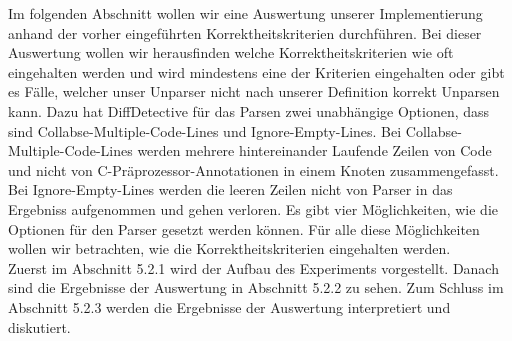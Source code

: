 Im folgenden Abschnitt wollen wir eine Auswertung unserer Implementierung anhand der vorher eingeführten Korrektheitskriterien durchführen. Bei dieser Auswertung wollen wir herausfinden welche Korrektheitskriterien wie oft eingehalten werden und wird mindestens eine der Kriterien eingehalten oder gibt es Fälle, welcher unser Unparser nicht nach unserer Definition korrekt Unparsen kann. Dazu hat DiffDetective für das Parsen zwei unabhängige Optionen, dass sind Collabse-Multiple-Code-Lines und Ignore-Empty-Lines. Bei Collabse-Multiple-Code-Lines werden mehrere hintereinander Laufende Zeilen von Code und nicht von C-Präprozessor-Annotationen in einem Knoten zusammengefasst. Bei Ignore-Empty-Lines werden die leeren Zeilen nicht von Parser in das Ergebniss aufgenommen und gehen verloren. Es gibt vier Möglichkeiten, wie die Optionen für den Parser gesetzt werden können. Für alle diese Möglichkeiten wollen wir betrachten, wie die Korrektheitskriterien eingehalten werden.\\

Zuerst im Abschnitt 5.2.1 wird der Aufbau des Experiments vorgestellt. Danach sind die Ergebnisse der Auswertung in Abschnitt 5.2.2 zu sehen. Zum Schluss im Abschnitt 5.2.3 werden die Ergebnisse der Auswertung interpretiert und diskutiert.



